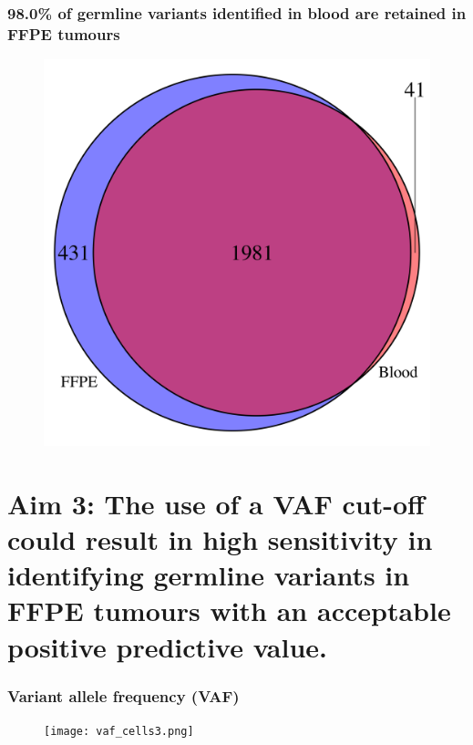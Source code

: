 \documentclass{beamer}
\begin{document}
\begin{frame}
\frametitle{98.0\% of germline variants identified in blood are retained in FFPE tumours}
\vspace{-2mm}
\begin{figure}[t]
  \includegraphics[scale=0.05]{ffpe_blood_conc_venn.png}
\end{figure}
\vspace{-4mm}
\centering
{}
\end{frame}

\section[Aim 3]{Aim 3: The use of a VAF cut-off could result in high sensitivity in identifying germline variants in FFPE tumours with an acceptable positive predictive value.}

\begin{frame}
\frametitle{Variant allele frequency (VAF)}
\begin{figure}[t]
    \texttt{[image: vaf\_cells3.png]}
\end{figure}
\end{frame}
\end{document}

